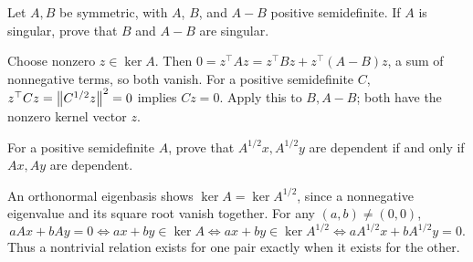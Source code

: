 \begin{problem}\label{ex:10:singular-order}
Let \(A,B\) be symmetric, with \(A\), \(B\), and \(A-B\) positive
semidefinite. If \(A\) is singular, prove that \(B\) and \(A-B\) are singular.
\end{problem}
\begin{solution}
Choose nonzero \(z\in\ker A\). Then
\(0=z^\top Az=z^\top Bz+z^\top(A-B)z\), a sum of nonnegative terms,
so both vanish. For a positive semidefinite \(C\),
\(z^\top Cz=\left\lVert C^{1/2}z\right\rVert^2=0\) implies \(Cz=0\).
Apply this to \(B,A-B\); both have the nonzero kernel vector \(z\).
\end{solution}

\begin{problem}\label{ex:10:sqrt-dependence}
For a positive semidefinite \(A\), prove that \(A^{1/2}x,A^{1/2}y\)
are dependent if and only if \(Ax,Ay\) are dependent.
\end{problem}
\begin{solution}
An orthonormal eigenbasis shows \(\ker A=\ker A^{1/2}\), since a
nonnegative eigenvalue and its square root vanish together.
For any \((a,b)\ne(0,0)\),
\[
aAx+bAy=0\iff ax+by\in\ker A
\iff ax+by\in\ker A^{1/2}\iff aA^{1/2}x+bA^{1/2}y=0.
\]
Thus a nontrivial relation exists for one pair exactly when it exists for the other.
\end{solution}

